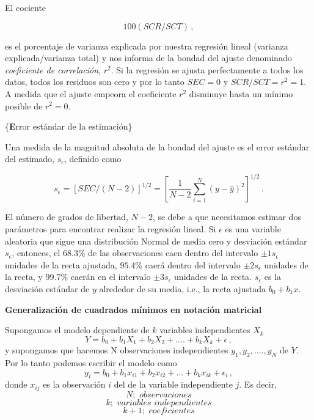 \documentclass[
]{agujournal2019}
\begin{document}
\noindent El cociente

\[100(SCR/SCT)\,,\]

es el porcentaje de varianza explicada por nuestra regresión lineal
(varianza explicada/varianza total) y nos informa de la bondad del
ajuste denominado \emph{coeficiente de correlación}, \(r^2\). Si la
regresión se ajusta perfectamente a todos los datos, todos los residuos
son cero y por lo tanto \(SEC=0\) y \(SCR/SCT=r^2=1\). A medida que el
ajuste empeora el coeficiente \(r^2\) disminuye hasta un mínimo posible
de \(r^2=0\).

\vspace{0.5cm}

\{\noindent \textbf Error estándar de la estimación\}

\noindent Una medida de la magnitud absoluta de la bondad del ajuste es
el error estándar del estimado, \(s_{\epsilon}\), definido como

\[s_{\epsilon}=[SEC/(N-2)]^{1/2}=\left[ \frac{1}{N-2}\sum\limits^N_{i=1} (y-\hat{y})^2\right]^{1/2}\,.\]

El número de grados de libertad, \(N-2\), se debe a que necesitamos
estimar dos parámetros para encontrar realizar la regresión lineal. Si
\({\epsilon}\) es una variable aleatoria que sigue una distribución
Normal de media cero y desviación estándar \(s_{\epsilon}\), entonces,
el \(68.3\%\) de las observaciones caen dentro del intervalo
\(\pm 1s_{\epsilon}\) unidades de la recta ajustada, \(95.4\%\) caerá
dentro del intervalo \(\pm 2 s_{\epsilon}\) unidades de la recta, y
\(99.7\%\) caerán en el intervalo \(\pm 3 s_{\epsilon}\) unidades de la
recta. \(s_{\epsilon}\) es la desviación estándar de \(y\) alrededor de
su media, i.e., la recta ajustada \(b_0 + b_1 x\).

\vspace{0.5cm}

\textbf{Generalización de cuadrados mínimos en notación matricial}

\noindent Supongamos el modelo dependiente de \(k\) variables
independientes \(X_k\)
\[Y=b_0 + b_1 X_1 + b_2 X_2 + .... + b_k X_k + \epsilon\,,\] y
supongamos que hacemos N observaciones independientes
\(y_1, y_2,....,y_N\) de \(Y\). Por lo tanto podemos escribir el modelo
como
\[y_i=b_0 + b_1 x_{i1} + b_2 x_{i2} + ... + b_k x_{ik} + \epsilon_i\,,\]
donde \(x_{ij}\) es la observación \(i\) del de la variable
independiente \(j\). Es decir, \[N;\,\,{ observaciones}\]
\[k;\,\,{ variables\,\,independientes}\] \[k+1;\,\,{ coeficientes}\]
\end{document}
